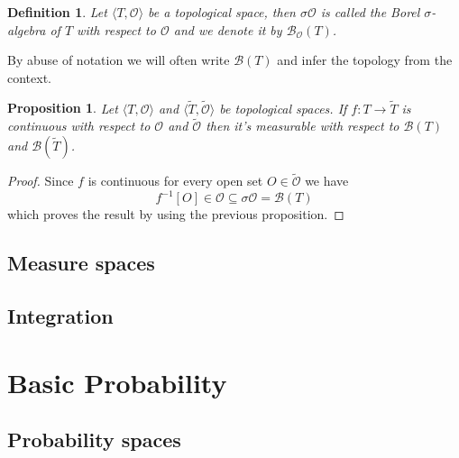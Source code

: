 \documentclass[a4paper]{amsart}
\newtheorem{deff}{Definition}
\newtheorem{prop}{Proposition}
\newcommand{\borr}[2]{\mathscr{B}_{#1}\left(#2\right)}
\newcommand{\bor}[1]{\mathscr{B}\left(#1\right)}
\newcommand{\pair}[2]{\langle #1, #2\rangle}
\begin{document}
\begin{deff}
    Let $\pair{T}{\mathcal{O}}$ be a topological space, then 
    $\sigma\mathcal{O}$ is called the Borel $\sigma$-algebra 
    of $T$ with respect to $\mathcal{O}$ and we denote it by 
    $\borr{\mathcal{O}}{T}$.
\end{deff}

By abuse of notation we will often write $\bor{T}$ and infer 
the topology from the context.

\begin{prop}
    Let $\pair{T}{\mathcal{O}}$ and $\pair{\tilde{T}}{\tilde{\mathcal{O}}}$ be topological spaces. 
    If $f : T \longrightarrow \tilde{T}$ is continuous with 
    respect to $\mathcal{O}$ and $\tilde{\mathcal{O}}$ then 
    it's measurable with respect to $\bor{T}$ and $
    \bor{\tilde{T}}$.
\end{prop}

\begin{proof}
    Since $f$ is continuous for every open set $O \in 
    \tilde{\mathcal{O}}$  we have
    $$
    f^{-1}[O] \in \mathcal{O} \subseteq \sigma\mathcal{O} 
    = \bor{T}
    $$
    which proves the result by using the previous proposition.
\end{proof}



\subsection{Measure spaces}

\subsection{Integration}

\section{Basic Probability}

\subsection{Probability spaces}
\end{document}
